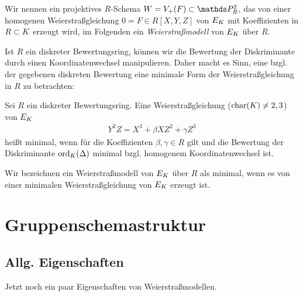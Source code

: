 \documentclass[german]{scrreprt}
\begin{document}
\begin{Definition}[Weierstraßmodell]
  Wir nennen ein projektives $R$-Schema $W=V_+(F)\subset\P_R^2$, das
  von einer homogenen Weierstraßgleichung $0=F\in R[X,Y,Z]$ von $E_{K}$
  mit Koeffizienten in $R\subset K$ erzeugt wird, im Folgenden
  ein \emph{Weierstraßmodell} von $E_{K}$ über $R$.
\end{Definition}

Ist $R$ ein diskreter Bewertungsring, können wir die Bewertung der
Diskriminante durch einen Koordinatenwechsel manipulieren. Daher macht
es Sinn, eine bzgl. der gegebenen diskreten Bewertung eine minimale
Form der Weierstraßgleichung in $R$ zu betrachten:
\begin{Definition}
  Sei $R$ ein diskreter Bewertungsring.
  Eine Weierstraßgleichung ($\operatorname{char}(K)\neq2,3$) von $E_{K}$
  \begin{gather*}
    Y^2Z = X^3 + \beta XZ^2 + \gamma Z^3
  \end{gather*}
  heißt minimal, wenn für die Koeffizienten $\beta, \gamma\in R$ gilt
  und die Bewertung der Diskriminante $\operatorname{ord}_{K}(\Delta)$ minimal
  bzgl. homogenem Koordinatenwechsel ist.

  Wir bezeichnen ein Weierstraßmodell von $E_{K}$ über $R$ als minimal,
  wenn es von einer minimalen Weierstraßgleichung von $E_{K}$ erzeugt
  ist.
\end{Definition}


\section{Gruppenschemastruktur}
\subsection{Allg. Eigenschaften}
Jetzt noch ein paar Eigenschaften von Weierstraßmodellen.
\end{document}
